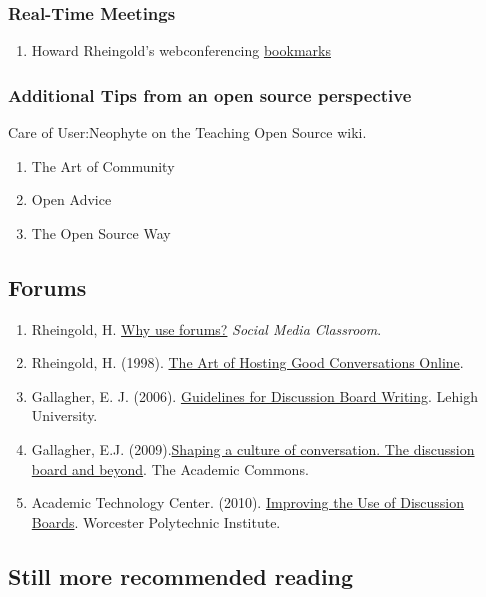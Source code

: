 \subsubsection{Real-Time Meetings}

\begin{enumerate}
\item Howard Rheingold's webconferencing \href{http://delicious.com/hrheingold/webconferencing}{bookmarks}
\end{enumerate}

\subsubsection{Additional Tips from an open source perspective}

Care of User:Neophyte on the Teaching Open Source wiki.

\begin{enumerate}
\item
  The Art of Community
\item
  Open Advice
\item
  The Open Source Way
\end{enumerate}
\subsection{Forums}

\begin{enumerate}
\item
  Rheingold, H. \href{http://blip.tv/file/1123048}{Why use forums?}
  \emph{Social Media Classroom}.
\item
  Rheingold, H. (1998).
  \href{http://www.rheingold.com/texts/artonlinehost.html}{The Art of
  Hosting Good Conversations Online}.
\item
  Gallagher, E. J. (2006).
  \href{http://www.lehigh.edu/~indiscus/doc\_guidelines.html}{Guidelines
  for Discussion Board Writing}. Lehigh University.
\item
  Gallagher, E.J.
  (2009).\href{http://www.academiccommons.org/2009/01/shaping-a-culture-of-conversation-the-discussion-board-and-beyond/}{Shaping
  a culture of conversation. The discussion board and beyond}. The
  Academic Commons.
\item
  Academic Technology Center. (2010).
  \href{http://www.wpi.edu/Academics/ATC/Collaboratory/Idea/boards.html}{Improving
  the Use of Discussion Boards}. Worcester Polytechnic Institute.
\end{enumerate}
\subsection{Still more recommended reading}

